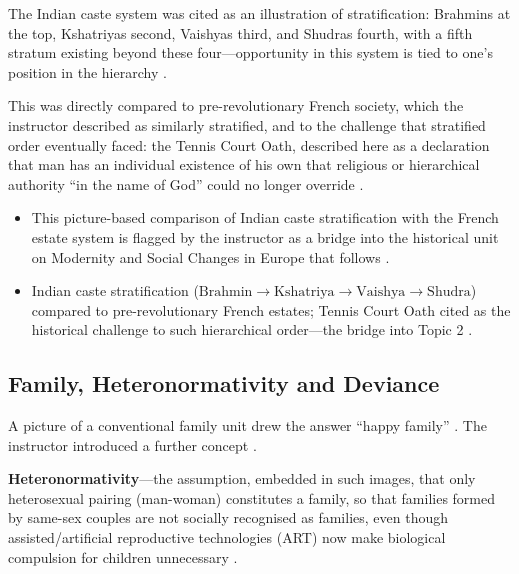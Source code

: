 \begin{GovtPolicy}
The Indian caste system was cited as an illustration of stratification: Brahmins at the top, Kshatriyas second, Vaishyas third, and Shudras fourth, with a fifth stratum existing beyond these four---opportunity in this system is tied to one's position in the hierarchy .

This was directly compared to pre-revolutionary French society, which the instructor described as similarly stratified, and to the challenge that stratified order eventually faced: the Tennis Court Oath, described here as a declaration that man has an individual existence of his own that religious or hierarchical authority ``in the name of God'' could no longer override .
\end{GovtPolicy}

\begin{PYQLink}
\begin{itemize}
    \item This picture-based comparison of Indian caste stratification with the French estate system is flagged by the instructor as a bridge into the historical unit on Modernity and Social Changes in Europe that follows .
\end{itemize}
\end{PYQLink}

\begin{QuickRevision}
\begin{itemize}
    \item Indian caste stratification ($\text{Brahmin} \rightarrow \text{Kshatriya} \rightarrow \text{Vaishya} \rightarrow \text{Shudra}$) compared to pre-revolutionary French estates; Tennis Court Oath cited as the historical challenge to such hierarchical order---the bridge into Topic 2 .
\end{itemize}
\end{QuickRevision}

\subsection{Family, Heteronormativity and Deviance}
A picture of a conventional family unit drew the answer ``happy family'' . The instructor introduced a further concept .

\begin{KeyConcept}
\textbf{Heteronormativity}---the assumption, embedded in such images, that only heterosexual pairing (man-woman) constitutes a family, so that families formed by same-sex couples are not socially recognised as families, even though assisted/artificial reproductive technologies (ART) now make biological compulsion for children unnecessary .
\end{KeyConcept}

